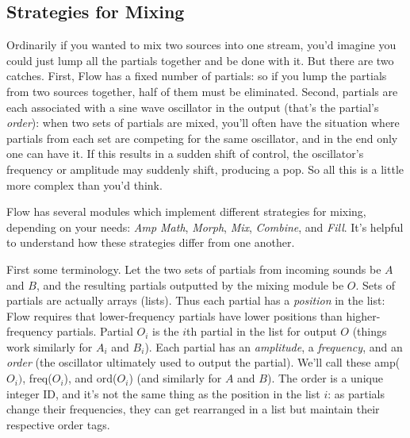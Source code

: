 \documentclass{article}
\newcommand\name{Flow}
\begin{document}
\subsection{Strategies for Mixing}
\label{mixingstrategies}

Ordinarily if you wanted to mix two sources into one stream, you'd imagine you could just lump all the partials together and be done with it.  But there are two catches.  First, {\name} has a fixed number of partials: so if you lump the partials from two sources together, half of them must be eliminated.  Second, partials are each associated with a sine wave oscillator in the output (that's the partial's {\it order}): when two sets of partials are mixed, you'll often have the situation where partials from each set are competing for the same oscillator, and in the end only one can have it.   If this results in a sudden shift of control, the oscillator's frequency or amplitude may suddenly shift, producing a pop. So all this is a little more complex than you'd think.

{\name} has several modules which implement different strategies for mixing, depending on your needs: {\it Amp Math}, {\it Morph}, {\it Mix}, {\it Combine}, and {\it Fill}. It's helpful to understand how these strategies differ from one another.

First some terminology.  Let the two sets of partials from incoming sounds be \(A\) and \(B\), and the resulting partials outputted by the mixing module be \(O\).   Sets of partials are actually arrays (lists).  Thus each partial has a {\it position} in the list: {\name} requires that lower-frequency partials have lower positions than higher-frequency partials.  Partial \(O_i\) is the \(i\)th partial in the list for output \(O\) (things work similarly for \(A_i\) and \(B_i\)).  Each partial has an {\it amplitude}, a {\it frequency}, and an {\it order} (the oscillator ultimately used to output the partial).  We'll call these amp(\(O_i)\), freq(\(O_i\)), and ord(\(O_i\)) (and similarly for \(A\) and \(B\)).  The order is a unique integer ID, and it's not the same thing as the position in the list \(i\): as partials change their frequencies, they can get rearranged in a list but maintain their respective order tags.
\end{document}

